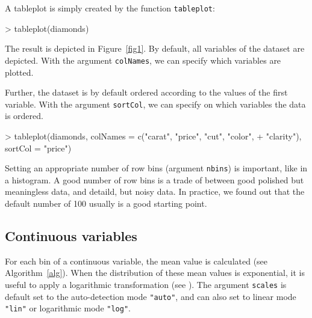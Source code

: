 \documentclass[11pt, fleqn, a4paper]{article}
\begin{document}
\begin{Schunk}
\end{Schunk}


A tableplot is simply created by the function {\tt tableplot}:
\begin{Schunk}
\begin{Sinput}
> tableplot(diamonds)
\end{Sinput}
\end{Schunk}

The result is depicted in Figure~\ref{fig1}. By default, all variables of the dataset are depicted. With the argument {\tt colNames}, we can specify which variables are plotted. 

Further, the dataset is by default ordered according to the values of the first variable. With the argument {\tt sortCol}, we can specify on which variables the data is ordered.

\begin{Schunk}
\begin{Sinput}
> tableplot(diamonds, colNames = c("carat", "price", "cut", "color", 
+     "clarity"), sortCol = "price")
\end{Sinput}
\end{Schunk}

Setting an appropriate number of row bins (argument {\tt nbins}) is important, like in a histogram. A good number of row bins is a trade of between good polished but meaningless data, and detaild, but noisy data. In practice, we found out that the default number of 100 usually is a good starting point.


\subsection{Continuous variables}

For each bin of a continuous variable, the mean value is calculated (see Algorithm~\ref{alg}).
When the distribution of these mean values is exponential, it is useful to apply a logarithmic transformation (see \cite{ten11}). The argument {\tt scales} is default set to the auto-detection mode {\tt "auto"}, and can also set to linear mode {\tt "lin"} or logarithmic mode {\tt "log"}.
\end{document}
